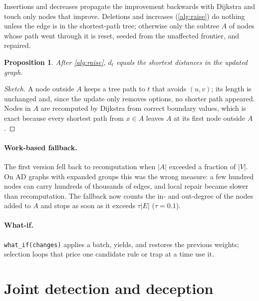\documentclass[10pt,twocolumn]{article}
\newtheorem{proposition}{Proposition}
\begin{document}
Insertions and decreases propagate the improvement backwards with Dijkstra and touch
only nodes that improve. Deletions and increases (\cref{alg:raise}) do nothing unless
the edge is in the shortest-path tree; otherwise only the subtree $A$ of nodes whose path
went through it is reset, seeded from the unaffected frontier, and repaired.

\begin{proposition}
After \cref{alg:raise}, $d_t$ equals the shortest distances in the updated graph.
\end{proposition}
\begin{proof}[Sketch]
A node outside $A$ keeps a tree path to $t$ that avoids $(u,v)$; its length is unchanged
and, since the update only removes options, no shorter path appeared. Nodes in $A$ are
recomputed by Dijkstra from correct boundary values, which is exact because every
shortest path from $x\in A$ leaves $A$ at its first node outside $A$.
\end{proof}

\paragraph{Work-based fallback.} The first version fell back to recomputation when $|A|$
exceeded a fraction of $|V|$. On AD graphs with expanded groups this was the wrong
measure: a few hundred nodes can carry hundreds of thousands of edges, and local repair
became slower than recomputation. The fallback now counts the in- and out-degree of the
nodes added to $A$ and stops as soon as it exceeds $\tau|E|$ ($\tau=0.1$).

\paragraph{What-if.} \texttt{what\_if(changes)} applies a batch, yields, and restores the
previous weights; selection loops that price one candidate rule or trap at a time use it.

\section{Joint detection and deception}\label{sec:joint}
\end{document}
